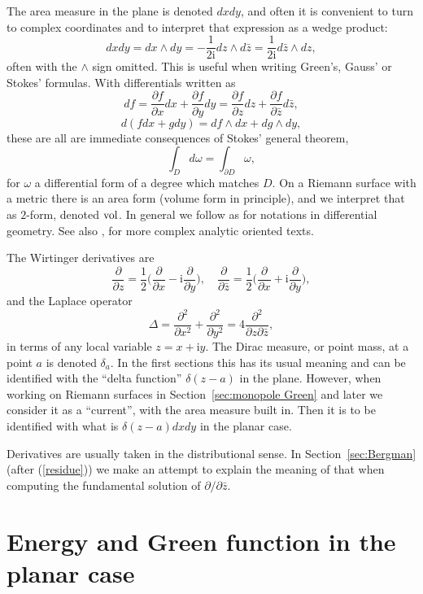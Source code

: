 \documentclass[reqno,12pt]{article}
\theoremstyle{plain}
\theoremstyle{definition}
\numberwithin{equation}{section}
\numberwithin{figure}{section}
\def\I{\mathrm{i}}
\begin{document}
The area measure in the plane is denoted $dxdy$, and often it is convenient to turn to complex coordinates and to interpret
that expression as a wedge product:
$$
dxdy=dx\wedge dy= -\frac{1}{2\I}dz\wedge d\bar{z}= \frac{1}{2\I}d\bar{z}\wedge dz, 
$$ 
often with the $\wedge$ sign omitted. This is useful when writing Green's, Gauss' or Stokes'  formulas. With
differentials written as
$$
df=\frac{\partial f}{\partial x}dx+\frac{\partial f}{\partial y}dy=\frac{\partial f}{\partial z}dz
+\frac{\partial f}{\partial \bar{z}}d\bar{z},
$$ 
$$
d(fdx+gdy)=df\wedge dx +dg\wedge dy, 
$$
these are all are immediate consequences of Stokes' general theorem,
$$
\int_D d\omega =\int_{\partial D}\omega,
$$
for $\omega$ a differential form of a degree which matches $D$. On a Riemann surface with a metric there is an area form (volume form
in principle), and we interpret that as $2$-form, denoted ${\rm vol}$. In general we follow \cite{Frankel-2012} as for
notations in differential geometry. See also \cite{Griffiths-Harris-1978, Krantz-2004}, for more complex analytic oriented texts.

The Wirtinger derivatives are
$$
\frac{\partial}{\partial z}=\frac{1}{2}\big(\frac{\partial}{\partial x}-\I\frac{\partial}{\partial y}\big), \quad
\frac{\partial}{\partial \bar{z}}=\frac{1}{2}\big(\frac{\partial}{\partial x}+\I\frac{\partial}{\partial y}\big),$$
and the Laplace operator 
$$
\Delta=\frac{\partial^2}{\partial x^2}+\frac{\partial^2}{\partial y^2}=4\frac{\partial^2}{\partial z \partial \bar{z}},
$$ 
 in terms of any local variable $z=x+\I y$.
The Dirac measure, or point mass, at a point $a$ is denoted  $\delta_a$. In the first sections this has its usual meaning
and can be identified with the ``delta function'' $\delta(z-a)$ in the plane. However, when working on Riemann surfaces
in Section~\ref{sec:monopole Green} and later we consider it as a ``current'', with the area measure built in. Then it is to be 
identified with what is $\delta(z-a)dxdy$ in the planar case.

Derivatives are usually taken in the distributional sense. In Section~\ref{sec:Bergman} (after (\ref{residue}))
we make an attempt to explain the
meaning of that when computing the fundamental solution of $\partial/\partial\bar{z}$. 


\section{Energy and Green function in the planar case}\label{sec:energy and Green}
\end{document}
